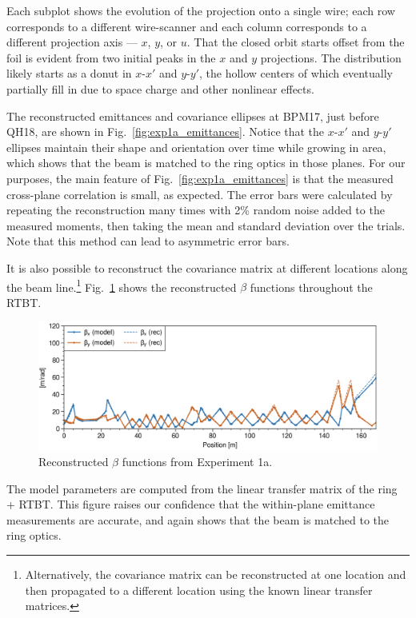 %
Each subplot shows the evolution of the projection onto a single wire; each row corresponds to a different wire-scanner and each column corresponds to a different projection axis — $x$, $y$, or $u$. That the closed orbit starts offset from the foil is evident from two initial peaks in the $x$ and $y$ projections. The distribution likely starts as a donut in $x$-$x'$ and $y$-$y'$, the hollow centers of which eventually partially fill in due to space charge and other nonlinear effects.

The reconstructed emittances and covariance ellipses at BPM17, just before QH18, are shown in Fig.~\ref{fig:exp1a_emittances}. Notice that the $x$-$x'$ and $y$-$y'$ ellipses maintain their shape and orientation over time while growing in area, which shows that the beam is matched to the ring optics in those planes. For our purposes, the main feature of Fig.~\ref{fig:exp1a_emittances} is that the measured cross-plane correlation is small, as expected. The error bars were calculated by repeating the reconstruction many times with 2\% random noise added to the measured moments, then taking the mean and standard deviation over the trials. Note that this method can lead to asymmetric error bars.

It is also possible to reconstruct the covariance matrix at different locations along the beam line.\footnote{Alternatively, the covariance matrix can be reconstructed at one location and then propagated to a different location using the known linear transfer matrices.}  Fig.~\ref{fig:exp1a_rec_betas_throughout} shows the reconstructed $\beta$ functions throughout the RTBT.
%
\begin{figure}[!p]
    \centering
    \includegraphics[width=1.0\textwidth]{Images/chapter5/exp1a/rec_betas_throughout.png}
    \caption{Reconstructed $\beta$ functions from Experiment 1a.}
    \label{fig:exp1a_rec_betas_throughout}
\end{figure}
%
The model parameters are computed from the linear transfer matrix of the ring + RTBT. This figure raises our confidence that the within-plane emittance measurements are accurate, and again shows that the beam is matched to the ring optics.



